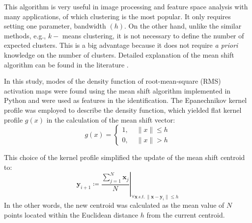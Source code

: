 This algorithm is very useful in image processing and feature space analysis with many applications, of which clustering is the most popular. It only requires setting one parameter, bandwidth $(h)$. On the other hand, unlike the similar methods, e.g., $k-$ means clustering, it is not necessary to define the number of expected clusters. This is a big advantage because it does not require \textit{a priori} knowledge on the number of clusters. Detailed explanation of the mean shift algorithm can be found in the literature \citep{Comaniciu2002, Fukunaga1975}.

In this study, modes of the density function of root-mean-square (RMS) activation maps were found using the mean shift algorithm implemented in Python \citep{scikit-learn} and were used as features in the identification. The Epanechnikov kernel profile was employed to describe the density function, which yielded flat kernel profile $g(x)$ in the calculation of the mean shift vector:
\begin{equation} \label{eq:3-A14}
g (x) = \left\{\begin{array}{lr} 1, & \,\, \parallel x \parallel \leq h \\
0,  & \,\,\parallel x \parallel > h \end{array}\right.
\end{equation}

This choice of the kernel profile simplified the update of the mean shift centroid to:
\begin{equation} \label{eq:3-A15}
\left. \mathbf{y}_{i+1} \coloneqq \frac{\sum_{j=1}^{N} \mathbf{x}_j}{N} \right\vert_{\forall \mathbf{x} \,s.t. \,\parallel \mathbf{x}-\mathbf{y}_i \parallel \leq h}
\end{equation}
In the other words, the new centroid was calculated as the mean value of $N$ points located within the Euclidean distance $h$ from the current centroid.

